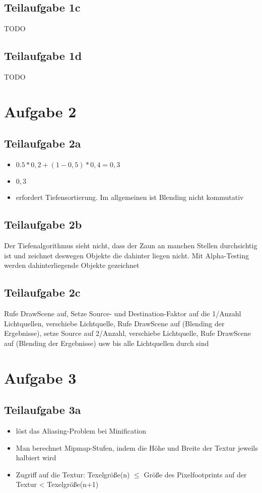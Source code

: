 \documentclass[a4paper]{scrartcl}
\begin{document}
\subsection*{Teilaufgabe 1c}
TODO

\subsection*{Teilaufgabe 1d}
TODO

\section*{Aufgabe 2}
\subsection*{Teilaufgabe 2a}
\begin{itemize}
    \item $0.5 * 0,2 + (1-0,5)*0,4 = 0,3$
    \item $0,3$
    \item erfordert Tiefensortierung. Im allgemeinen ist Blending nicht
          kommutativ
\end{itemize}

\subsection*{Teilaufgabe 2b}
Der Tiefenalgorithmus sieht nicht, dass der Zaun an manchen Stellen
durchsichtig ist und zeichnet deswegen Objekte die dahinter liegen nicht. Mit
Alpha-Testing werden dahinterliegende Objekte gezeichnet

\subsection*{Teilaufgabe 2c}
Rufe DrawScene auf, Setze Source- und Destination-Faktor auf die 1/Anzahl
Lichtquellen, verschiebe Lichtquelle, Rufe DrawScene auf (Blending der
Ergebnisse), setze Source auf 2/Anzahl, verschiebe Lichtquelle, Rufe DrawScene
auf (Blending der Ergebnisse) usw bis alle Lichtquellen durch sind

\section*{Aufgabe 3}
\subsection*{Teilaufgabe 3a}
\begin{itemize}
\item löst das Aliasing-Problem bei Minification
\item Man berechnet Mipmap-Stufen, indem die Höhe und Breite der Textur jeweils halbiert wird
\item Zugriff auf die Textur: Texelgröße(n) $\leq$ Größe des Pixelfootprints auf der Textur < Texelgröße(n+1)
\end{itemize}
\end{document}
